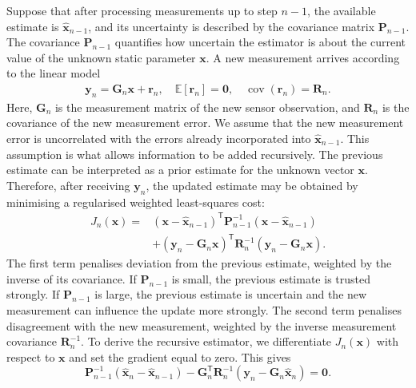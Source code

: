 Suppose that after processing measurements up to step $n-1$, the available estimate is $\widehat{\mathbf{x}}_{n-1}$, and its uncertainty is described by the covariance matrix $\mathbf{P}_{n-1}$. The covariance $\mathbf{P}_{n-1}$ quantifies how uncertain the estimator is about the current value of the unknown static parameter $\mathbf{x}$. A new measurement arrives according to the linear model
\begin{align*}
\mathbf{y}_n
=
\mathbf{G}_n\mathbf{x}
+
\mathbf{r}_n,
\quad
\mathbb{E}[\mathbf{r}_n]=\mathbf{0},
\quad
\operatorname{cov}(\mathbf{r}_n)=\mathbf{R}_n.
\end{align*}
Here, $\mathbf{G}_n$ is the measurement matrix of the new sensor observation, and $\mathbf{R}_n$ is the covariance of the new measurement error. We assume that the new measurement error is uncorrelated with the errors already incorporated into $\widehat{\mathbf{x}}_{n-1}$. This assumption is what allows information to be added recursively. The previous estimate can be interpreted as a prior estimate for the unknown vector $\mathbf{x}$. Therefore, after receiving $\mathbf{y}_n$, the updated estimate may be obtained by minimising a regularised weighted least-squares cost:
\begin{align}
J_n(\mathbf{x})
=&
\left(
\mathbf{x}
-
\widehat{\mathbf{x}}_{n-1}
\right)^{\mathsf T}
\mathbf{P}_{n-1}^{-1}
\left(
\mathbf{x}
-
\widehat{\mathbf{x}}_{n-1}
\right) \\
&+
\left(
\mathbf{y}_n
-
\mathbf{G}_n\mathbf{x}
\right)^{\mathsf T}
\mathbf{R}_n^{-1}
\left(
\mathbf{y}_n
-
\mathbf{G}_n\mathbf{x}
\right). \nonumber
\end{align}
The first term penalises deviation from the previous estimate, weighted by the inverse of its covariance. If $\mathbf{P}_{n-1}$ is small, the previous estimate is trusted strongly. If $\mathbf{P}_{n-1}$ is large, the previous estimate is uncertain and the new measurement can influence the update more strongly. The second term penalises disagreement with the new measurement, weighted by the inverse measurement covariance $\mathbf{R}_n^{-1}$. To derive the recursive estimator, we differentiate $J_n(\mathbf{x})$ with respect to $\mathbf{x}$ and set the gradient equal to zero. This gives
\begin{equation}
\mathbf{P}_{n-1}^{-1}
\left(
\widehat{\mathbf{x}}_n
-
\widehat{\mathbf{x}}_{n-1}
\right)
-
\mathbf{G}_n^{\mathsf T}
\mathbf{R}_n^{-1}
\left(
\mathbf{y}_n
-
\mathbf{G}_n
\widehat{\mathbf{x}}_n
\right)
=
\mathbf{0}.
\end{equation}
